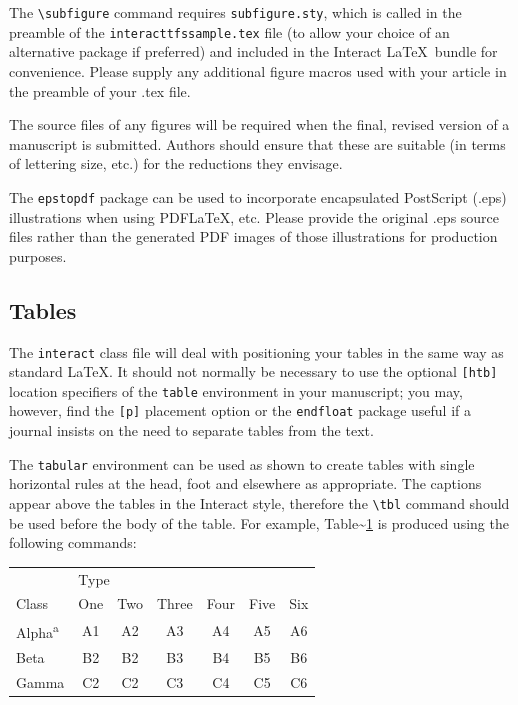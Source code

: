 \documentclass[]{interact}
\theoremstyle{plain}%
\theoremstyle{definition}
\theoremstyle{remark}
\begin{document}
The \texttt{\textbackslash{}subfigure} command requires \texttt{subfigure.sty}, which is called in the preamble of the \texttt{interacttfssample.tex} file (to allow your choice of an alternative package if preferred) and included in the \textsf{Interact} \LaTeX~bundle for convenience. Please supply any additional figure macros used with your article in the preamble of your .tex file.

The source files of any figures will be required when the final, revised version of a manuscript is submitted. Authors should ensure that these are suitable (in terms of lettering size, etc.) for the reductions they envisage.

The \texttt{epstopdf} package can be used to incorporate encapsulated PostScript (.eps) illustrations when using PDF\LaTeX, etc. Please provide the original .eps source files rather than the generated PDF images of those illustrations for production purposes.

\hypertarget{tables}{%
\subsection{Tables}\label{tables}}

The \texttt{interact} class file will deal with positioning your tables in the same way as standard \LaTeX. It should not normally be necessary to use the optional \texttt{{[}htb{]}} location specifiers of the \texttt{table} environment in your manuscript; you may, however, find the \texttt{{[}p{]}} placement option or the \texttt{endfloat} package useful if a journal insists on the need to separate tables from the text.

The \texttt{tabular} environment can be used as shown to create tables with single horizontal rules at the head, foot and elsewhere as appropriate. The captions appear above the tables in the \textsf{Interact} style, therefore the \texttt{\textbackslash{}tbl} command should be used before the body of the table. For example, Table\textasciitilde{}\ref{sample-table} is produced using the following commands:

\begin{table}
{\begin{tabular}{lcccccc} \toprule
 & \multicolumn{2}{l}{Type} \\ \cmidrule{2-7}
 Class & One & Two & Three & Four & Five & Six \\ \midrule
 Alpha\textsuperscript{a} & A1 & A2 & A3 & A4 & A5 & A6 \\
 Beta & B2 & B2 & B3 & B4 & B5 & B6 \\
 Gamma & C2 & C2 & C3 & C4 & C5 & C6 \\ \bottomrule
\end{tabular}}
\label{sample-table}
\end{table}
\end{document}
